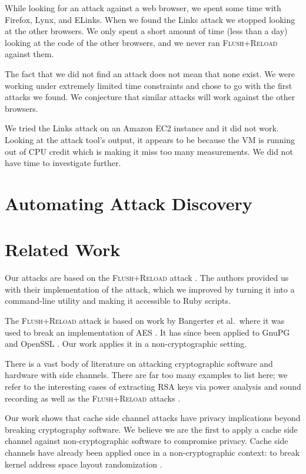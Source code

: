 \documentclass[letterpaper,twocolumn,10pt]{article}
\begin{document}
While looking for an attack against a web browser, we spent some time with
Firefox, Lynx, and ELinks. When we found the Links attack we stopped looking at
the other browsers. We only spent a short amount of time (less than a day)
looking at the code of the other browsers, and we never ran \textsc{Flush+Reload} against
them.

The fact that we did not find an attack does not mean that none exist. We were
working under extremely limited time constraints and chose to go with the first
attacks we found. We conjecture that similar attacks will work against the other
browsers.

We tried the Links attack on an Amazon EC2 instance and it did not work. Looking
at the attack tool's output, it appears to be because the VM is running out of
CPU credit which is making it miss too many measurements. We did not have time
to investigate further.

\section{Automating Attack Discovery}

\section{Related Work}
\label{sec:relwork}

Our attacks are based on the \textsc{Flush+Reload} attack \cite{yarom2013flush}.
The authors provided us with their implementation of the attack, which we
improved by turning it into a command-line utility and making it accessible to
Ruby scripts.

The \textsc{Flush+Reload} attack is based on work by Bangerter et al.\ where it was used
to break an implementation of AES \cite{gullasch2011cache}. It has since been
applied to GnuPG \cite{yarom2013flush} and OpenSSL \cite{benger2014ooh,
yarom2014recovering}. Our work applies it in a non-cryptographic setting.

There is a vast body of literature on attacking cryptographic software and
hardware with side channels. There are far too many examples to list here; we
refer to the interesting cases of extracting RSA keys via power analysis
\cite{messerges1999power} and sound recording \cite{genkin2013rsa} as well as
the \textsc{Flush+Reload} attacks \cite{yarom2013flush, benger2014ooh,
yarom2014recovering}.

Our work shows that cache side channel attacks have privacy implications beyond
breaking cryptography software. We believe we are the first to apply a cache
side channel against non-cryptographic software to compromise privacy. Cache
side channels have already been applied once in a non-cryptographic context: to
break kernel address space layout randomization \cite{hund2013practical}.
\end{document}
